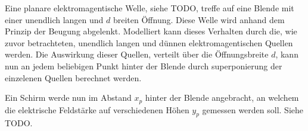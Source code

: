 Eine planare elektromagentische Welle, siehe TODO, treffe auf eine Blende mit einer unendlich langen und $d$ breiten Öffnung.
Diese Welle wird anhand dem Prinzip der Beugung abgelenkt.
Modelliert kann dieses Verhalten durch die, wie zuvor betrachteten, unendlich langen und dünnen elektromagentischen Quellen werden.
Die Auswirkung dieser Quellen, verteilt über die Öffnungsbreite $d$, kann nun an jedem beliebigen Punkt hinter der Blende durch superponierung der einzelenen Quellen berechnet werden.

Ein Schirm werde nun im Abstand $x_p$ hinter der Blende angebracht, an welchem die elektrische Feldstärke auf verschiedenen Höhen $y_p$ gemessen werden soll.
Siehe TODO.
